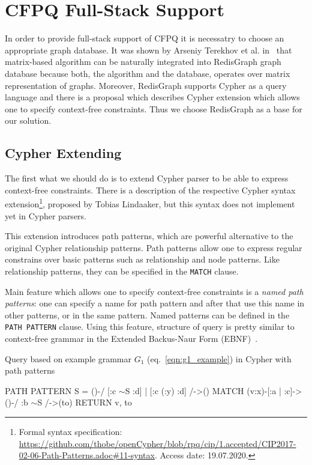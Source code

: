 \section{CFPQ Full-Stack Support}

In order to provide full-stack support of CFPQ it is necessatry to choose an appropriate graph database.
It was shown by Arseniy Terekhov et al. in~\cite{10.1145/3398682.3399163} that matrix-based algorithm can be naturally integrated into RedisGraph graph database because both, the algorithm and the database, operates over matrix representation of graphs.
Moreover, RedisGraph supports Cypher as a query language and there is a proposal which describes Cypher extension which allows one to specify context-free constraints.
Thus we choose RedisGraph as a base for our solution.  


\subsection{Cypher Extending}
\label{subsec:cypher-extension}

The first what we should do is to extend Cypher parser to be able to express context-free constraints.
There is a description of the respective Cypher syntax extension\footnote{\label{cypher-proposal}Formal syntax specification: \url{https://github.com/thobe/openCypher/blob/rpq/cip/1.accepted/CIP2017-02-06-Path-Patterns.adoc\#11-syntax}. Access date: 19.07.2020.}, proposed by Tobias Lindaaker, but this syntax does not implement yet in Cypher parsers.

This extension introduces path patterns, which are powerful alternative to the original Cypher relationship patterns.
Path patterns allow one to express regular constrains over basic patterns such as relationship and node patterns.
Like relationship patterns, they can be specified in the \texttt{MATCH} clause.

Main feature which allows one to specify context-free constraints is a \textit{named path patterns}: one can specify a name for path pattern and after that use this name in other patterns, or in the same pattern.
Named patterns can be defined in the \texttt{PATH PATTERN} clause.
Using this feature, structure of query is pretty similar to context-free grammar in the Extended Backus-Naur Form (EBNF)~\cite{EBNF_ISO}.

\begin{algorithm}
\begin{algorithmic}[1]
\caption{Query based on example grammar $G_1$ (eq.~\ref{eqn:g1_example}) in Cypher with path patterns}
\label{lst:cypher_example}
\State PATH PATTERN S = ()-/ [:c $\sim$S :d] | [:c (:y) :d] /->()
\State MATCH (v:x)-[:a | :c]->()-/ :b $\sim$S /->(to)
\State RETURN v, to
\end{algorithmic}
\end{algorithm}


